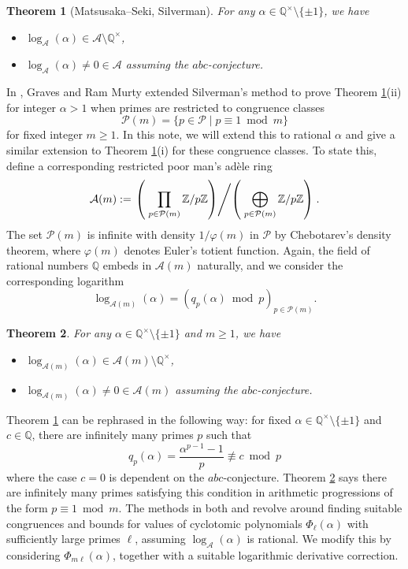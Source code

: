 \documentclass[10pt,a4paper]{amsart}
\newtheorem{theorem}{Theorem}[section]
\newcommand{\cA}{\mathcal A}
\newcommand{\cP}{\mathcal P}
\begin{document}
\begin{theorem}[Matsusaka--Seki, Silverman]\label{MSS}
For any $\alpha\in\mathbb{Q}^\times\setminus\{\pm 1\}$, we have 
\begin{itemize}
\item[(i)]
$\log_\cA(\alpha)\in\cA\setminus\mathbb{Q}^{\times}$, 
\item[(ii)]
$\log_\cA(\alpha)\neq 0\in\cA$ assuming the $abc$-conjecture.
\end{itemize}
\end{theorem}
In \cite{GRM13}, Graves and Ram Murty extended Silverman's method to prove Theorem \ref{MSS}(ii) for integer $\alpha>1$ when primes are restricted to congruence classes 
\[\cP(m)=\{p\in\cP\;|\; p\equiv 1\bmod m\}\]
for fixed integer $m\geq 1$. In this note, we will extend this to rational $\alpha$ and give a similar extension to Theorem \ref{MSS}(i) for these congruence classes. 
To state this, define a corresponding restricted poor man's ad\`{e}le ring
\[\cA(m):=\left.\left(\;\prod_{p\in\cP(m)}\mathbb{Z}/p\mathbb{Z}\right) \middle/ \left(\;\bigoplus_{p\in\cP(m)}\mathbb{Z}/p\mathbb{Z}\right)\right..\]
The set $\cP(m)$ is infinite with density $1/\varphi(m)$ in $\cP$ by Chebotarev's density theorem, where $\varphi(m)$ denotes Euler's totient function. 
Again, the field of rational numbers $\mathbb{Q}$ embeds in $\cA(m)$ naturally, and we consider the corresponding logarithm 
\[\log_{\cA(m)}(\alpha)=(q_p(\alpha)\bmod p)_{p\in\cP(m)}.\]

\begin{theorem}\label{logAm}
For any $\alpha\in\mathbb{Q}^\times\setminus\{\pm 1\}$ and $m\geq 1$, we have
\begin{itemize}
\item[(i)]
$\log_{\cA(m)}(\alpha)\in\cA(m)\setminus\mathbb{Q}^{\times}$, 
\item[(ii)]
$\log_{\cA(m)}(\alpha)\neq 0\in\cA(m)$ assuming the $abc$-conjecture.
\end{itemize}
\end{theorem}

Theorem \ref{MSS} can be rephrased in the following way: for fixed $\alpha\in\mathbb{Q}^\times\setminus\{\pm 1\}$ and $c\in\mathbb{Q}$, there are infinitely many primes $p$ such that 
\[q_p(\alpha)=\frac{\alpha^{p-1}-1}{p}\not\equiv c\bmod p\]
where the case $c=0$ is dependent on the $abc$-conjecture. Theorem \ref{logAm} says there are infinitely many primes satisfying this condition in arithmetic progressions of the form $p\equiv 1\bmod m$. 
The methods in both \cite{MS26} and \cite{Si88} revolve around finding suitable congruences and bounds for values of cyclotomic polynomials $\Phi_\ell(\alpha)$ with sufficiently large primes $\ell$, assuming $\log_\cA(\alpha)$ is rational. We modify this by considering $\Phi_{m\ell}(\alpha)$, together with a suitable logarithmic derivative correction.
\smallskip
\end{document}
